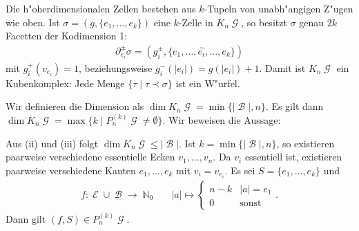 \documentclass[paper=A4, twoside, chapterprefix=true, bibliography=totoc, headsepline]{scrbook}
\DeclareMathOperator{\N}{\mathbb{N}}
\DeclareMathOperator{\calB}{{\mathcal{B}}}
\DeclareMathOperator{\calE}{{\mathcal{E}}}
\DeclareMathOperator{\calG}{{\mathcal{G}}}
\newcommand{\E}{\calE}
\newcommand{\G}{\calG}
\theoremstyle{nonumberbreak}
\theoremstyle{emptybreak}
\theoremstyle{break}
\begin{document}
Die h"oherdimensionalen Zellen bestehen aus $k$-Tupeln von unabh"angigen Z"ugen wie oben.
Ist $\sigma = (g, \{e_1, \ldots, e_k\})$ eine $k$-Zelle in $K_n\G$, so besitzt $\sigma$ genau $2k$ Facetten der Kodimension 1:
\begin{align*}
	\partial_{e_i}^\pm \sigma = ( g_i^\pm, \{e_1, \ldots, \hat{e_i}, \ldots, e_k \})
\end{align*}
mit $g_i^+(v_{e_i}) = 1$, beziehungsweise $g_i^-(|e_i|) = g(|e_i|) + 1$.
Damit ist $K_n\G$ ein Kubenkomplex: Jede Menge $\{ \tau \mid \tau \prec \sigma \}$ ist ein W"urfel.


Wir definieren die Dimension als $\dim K_n\G = \min \{ |\calB|, n\}$.
Es gilt dann $\dim K_n\G = \max \{k \mid P_n^{(k)}\G \ne \emptyset\}$.
Wir beweisen die Aussage:

Aus (ii) und (iii) folgt $\dim K_n\G \le |\calB|$.
Ist $k = \min \{|\calB|, n \}$, so existieren paarweise verschiedene essentielle Ecken $v_1, \ldots, v_n$.
Da $v_i$ essentiell ist, existieren paarweise verschiedene Kanten $e_1, \ldots, e_k$ mit $v_i = v_{e_i}$.
Es sei $S = \{e_1, \ldots, e_k\}$ und
\begin{align*}
	f: \E \cup \calB \to \N_0 && |a| \mapsto \begin{cases} n-k & |a| = e_1 \\ 0 & \text{sonst} \end{cases}.
\end{align*}
Dann gilt $(f, S) \in P_n^{(k)}\G$.
\end{document}
